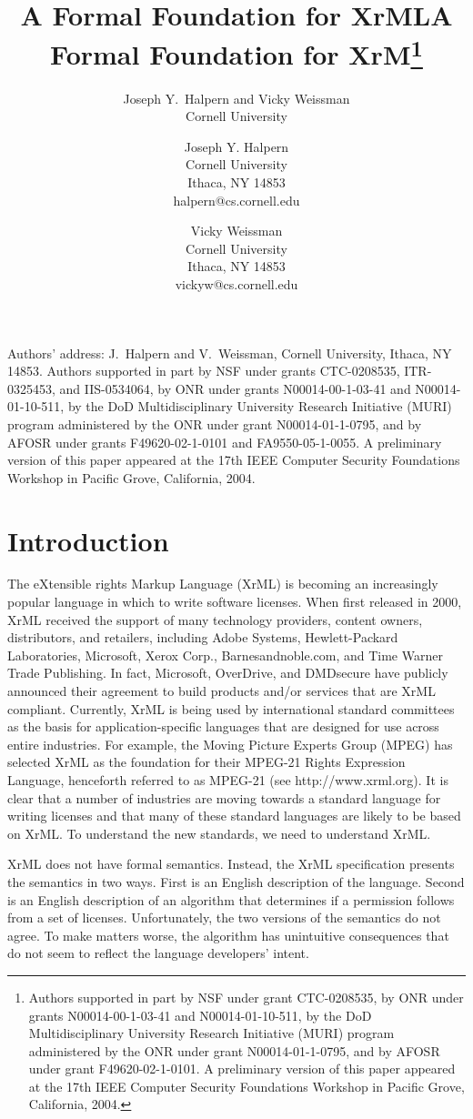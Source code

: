 \documentclass{acmtrans2m}
\title{A Formal Foundation for XrML}
\author{Joseph Y.~Halpern and Vicky Weissman \\ Cornell University}
\title{A Formal Foundation for XrM\thanks{Authors supported in part by NSF under grant
CTC-0208535, by ONR under grants  N00014-00-1-03-41 and
N00014-01-10-511, by the DoD Multidisciplinary University Research
Initiative (MURI) program administered by the ONR under
grant N00014-01-1-0795, and by AFOSR under grant F49620-02-1-0101.
A preliminary version of this paper appeared at the 17th IEEE Computer Security
Foundations Workshop in Pacific Grove, California, 2004.
}}
\author{
Joseph Y. Halpern\\
Cornell University\\
Ithaca, NY 14853\\
halpern@cs.cornell.edu
\and
Vicky Weissman\\
Cornell University\\
Ithaca, NY 14853\\
vickyw@cs.cornell.edu
}
\newcommand{\<}{
}
\renewcommand{\>}{\rangle}
\begin{document}
\begin{bottomstuff}
Authors' address: J.~Halpern and V.~Weissman, Cornell University,
Ithaca, NY 14853.\newline
Authors supported in part by NSF under
grants CTC-0208535, ITR-0325453, and IIS-0534064,
by ONR under grants  N00014-00-1-03-41 and
N00014-01-10-511, by the DoD Multidisciplinary University Research
Initiative (MURI) program administered by the ONR under
grant N00014-01-1-0795, and by AFOSR under
grants F49620-02-1-0101 and FA9550-05-1-0055.
A preliminary version of this paper appeared at the 17th IEEE Computer Security
Foundations Workshop in Pacific Grove, California, 2004.
\end{bottomstuff}

\maketitle
\section{Introduction}
The eXtensible rights Markup Language (XrML) is becoming an increasingly popular
language in which to write software licenses.  When first released in 2000, XrML
received the support of many technology providers, content owners, distributors,
and retailers, including Adobe Systems, Hewlett-Packard Laboratories, Microsoft,
Xerox Corp., Barnesandnoble.com, and Time Warner Trade Publishing.  In fact,
Microsoft, OverDrive, and DMDsecure have publicly announced their agreement to
build products and/or services that are XrML compliant.  Currently, XrML is being
used by international standard committees as the basis for application-specific
languages that are designed for use across entire industries.  For
example, the 
Moving Picture Experts Group (MPEG) has selected XrML as the foundation for their
MPEG-21 Rights Expression Language, henceforth referred to as MPEG-21
(see http://www.xrml.org).  It is clear that a number of industries are moving
towards a standard language for writing licenses and that many of these standard
languages are likely to be based on XrML.  To understand the new standards, we
need to understand XrML.

XrML does not have formal semantics.  Instead, the XrML specification \cite{XrML}
presents the semantics in two ways.  First is an English description of the
language.  Second is an English description of an algorithm that determines if a
permission follows from a set of licenses.  Unfortunately, the two versions of the
semantics do not agree.  To make matters worse, the algorithm has unintuitive
consequences that do not seem to reflect the language developers' intent.
\end{document}
